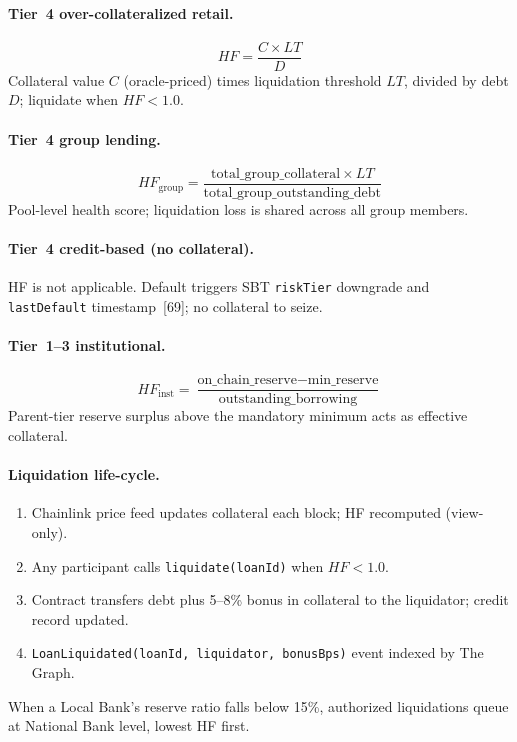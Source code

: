 \documentclass[12pt, a4paper]{report}
\begin{document}
\paragraph{Tier~4 over-collateralized retail.}
\begin{equation}
HF = \frac{C \times LT}{D}
\end{equation}
\noindent Collateral value $C$ (oracle-priced) times liquidation threshold $LT$, divided by debt $D$; liquidate when $HF < 1.0$.

\paragraph{Tier~4 group lending.}
\begin{equation}
HF_{\text{group}} = \frac{\text{total\_group\_collateral} \times LT}{\text{total\_group\_outstanding\_debt}}
\end{equation}
\noindent Pool-level health score; liquidation loss is shared across all group members.

\paragraph{Tier~4 credit-based (no collateral).}
HF is not applicable. Default triggers SBT \texttt{riskTier} downgrade and \texttt{lastDefault} timestamp~[69]; no collateral to seize.

\paragraph{Tier~1--3 institutional.}
\begin{equation}
HF_{\text{inst}} = \frac{\text{on\_chain\_reserve} - \text{min\_reserve}}{\text{outstanding\_borrowing}}
\end{equation}
\noindent Parent-tier reserve surplus above the mandatory minimum acts as effective collateral.

\paragraph{Liquidation life-cycle.}
\begin{enumerate}[noitemsep]
\item Chainlink price feed updates collateral each block; HF recomputed (view-only).
\item Any participant calls \texttt{liquidate(loanId)} when $HF < 1.0$.
\item Contract transfers debt plus 5--8\% bonus in collateral to the liquidator; credit record updated.
\item \texttt{LoanLiquidated(loanId, liquidator, bonusBps)} event indexed by The Graph.
\end{enumerate}
\noindent When a Local Bank's reserve ratio falls below 15\%, authorized liquidations queue at National Bank level, lowest HF first.
\end{document}
